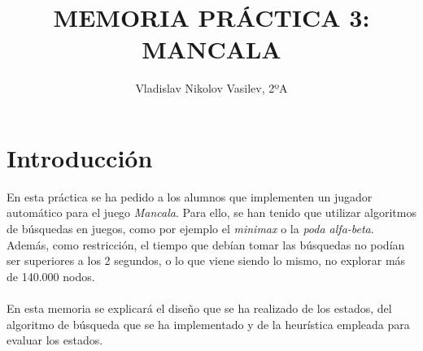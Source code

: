 \documentclass{article}
\title{
	MEMORIA PRÁCTICA 3: MANCALA \\}
\author{Vladislav Nikolov Vasilev, 2ºA}
\begin{document}
  \maketitle			  %
  \newpage				  %
  
  \section{Introducción}
  En esta práctica se ha pedido a los alumnos que implementen un jugador automático para el juego \textit{Mancala}. Para ello, se han tenido que utilizar algoritmos de búsquedas en juegos, como por ejemplo el \textit{minimax} o la \textit{poda alfa-beta}. Además, como restricción, el tiempo que debían tomar las búsquedas no podían ser superiores a los 2 segundos, o lo que viene siendo lo mismo, no explorar más de 140.000 nodos. \\\\
  En esta memoria se explicará el diseño que se ha realizado de los estados, del algoritmo de búsqueda que se ha implementado y de la heurística empleada para evaluar los estados.
  
\end{document}
